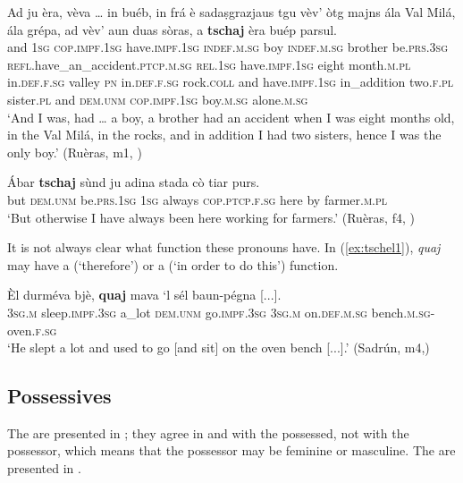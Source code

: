 \ea
\label{ex:tschaj:1}
\gll    Ad ju èra, vèva … in buéb, in frá è sadaṣgrazjaus tgu vèv’ òtg majns ála Val Milá, ála grépa, ad vèv' aun duas sòras, a \textbf{tschaj} èra buép parsul. \\
and \textsc{1sg} \textsc{cop.impf.1sg} have.\textsc{impf.1sg} {} \textsc{indef.m.sg} boy \textsc{indef.m.sg} brother be.\textsc{prs.3sg} \textsc{refl}.have\_an\_accident.\textsc{ptcp.m.sg} \textsc{rel.1sg} have.\textsc{impf.1sg} eight month.\textsc{m.pl} in.\textsc{def.f.sg} valley \textsc{pn} in.\textsc{def.f.sg} rock.\textsc{coll} and have.\textsc{impf.1sg} in\_addition two.\textsc{f.pl} sister.\textsc{pl} and \textsc{dem.unm}  \textsc{cop.impf.1sg} boy.\textsc{m.sg} alone.\textsc{m.sg}\\
\glt `And I was, had … a boy, a brother had an accident when I was eight months old, in the Val Milá, in the rocks, and in addition I had two sisters, hence I was the only boy.' (Ruèras, m1, )
\z 

\ea
\label{ex:tschaj:2}
\gll  Ábar \textbf{tschaj} sùnd ju adina stada cò tiar purs.\\
but \textsc{dem.unm} be.\textsc{prs.1sg} \textsc{1sg} always \textsc{cop.ptcp.f.sg} here by farmer.\textsc{m.pl}\\
\glt `But otherwise I have always been here working for farmers.' (Ruèras, f4, )
\z

It is not always clear what function these pronouns have. In (\ref{ex:tschel1}), \textit{quaj} may have a  (`therefore') or a  (`in order to do this') function.

\ea
\label{ex:tschel1}
\gll  Èl durméva bjè, \textbf{quaj} mava `l sél baun-pégna [...].\\
\textsc{3sg.m} sleep.\textsc{impf.3sg} a\_lot \textsc{dem.unm} go.\textsc{impf.3sg} \textsc{3sg.m} on.\textsc{def.m.sg} bench.\textsc{m.sg}-oven.\textsc{f.sg}\\
\glt `He slept a lot and used to go [and sit] on the oven bench [...].' (Sadrún, m4,)
\z

\subsection{Possessives}\label{sec:3.2.3}
The  are presented in ; they agree in  and  with the possessed, not with the possessor, which means that the possessor may be feminine or masculine. The  are presented in .



